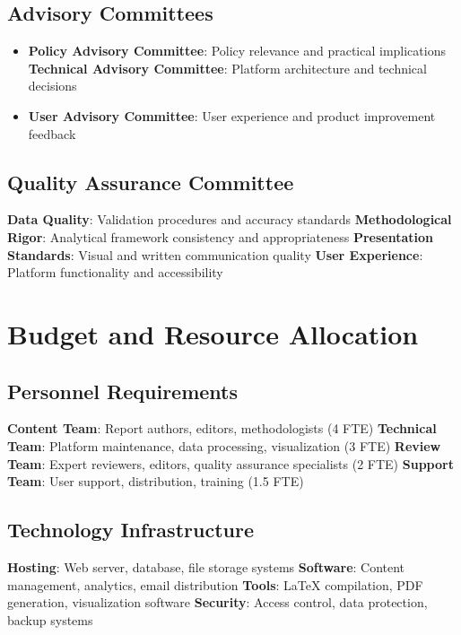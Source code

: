 \documentclass[11pt,a4paper]{article}
\begin{document}
\subsection{Advisory Committees}
\begin{itemize}
    \textbf{Academic Advisory Committee}: Research direction and methodology guidance
    \item \textbf{Policy Advisory Committee}: Policy relevance and practical implications
    \textbf{Technical Advisory Committee}: Platform architecture and technical decisions
    \item \textbf{User Advisory Committee}: User experience and product improvement feedback
\end{itemize}

\subsection{Quality Assurance Committee}
\begin{itemize}
    \textbf{Data Quality}: Validation procedures and accuracy standards
    \textbf{Methodological Rigor}: Analytical framework consistency and appropriateness
    \textbf{Presentation Standards}: Visual and written communication quality
    \textbf{User Experience}: Platform functionality and accessibility
\end{itemize}

\section{Budget and Resource Allocation}

\subsection{Personnel Requirements}
\begin{itemize}
    \textbf{Content Team}: Report authors, editors, methodologists (4 FTE)
    \textbf{Technical Team}: Platform maintenance, data processing, visualization (3 FTE)
    \textbf{Review Team}: Expert reviewers, editors, quality assurance specialists (2 FTE)
    \textbf{Support Team}: User support, distribution, training (1.5 FTE)
\end{itemize}

\subsection{Technology Infrastructure}
\begin{itemize}
    \textbf{Hosting}: Web server, database, file storage systems
    \textbf{Software}: Content management, analytics, email distribution
    \textbf{Tools}: LaTeX compilation, PDF generation, visualization software
    \textbf{Security}: Access control, data protection, backup systems
\end{itemize}
\end{document}
